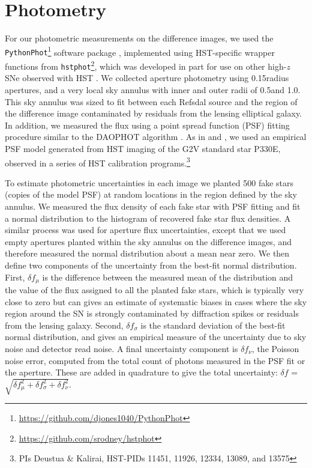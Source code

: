 \section{Photometry}\label{sec:Photometry}

For our photometric measurements on the difference images, we used the {\tt PythonPhot}\footnote{\url{https://github.com/djones1040/PythonPhot}} software package \citep{Jones:2015}, implemented using HST-specific wrapper functions from {\tt hstphot}\footnote{\url{https://github.com/srodney/hstphot}}, which was developed in part for use on other high-$z$ SNe observed with HST \citep[e.g.][]{Rodney:2015a,Rodney:2015b}.   We collected aperture photometry using 0.15\arcsec radius apertures, and a very local sky annulus with inner and outer radii of 0.5\arcsec and 1.0\arcsec.  This sky annulus was sized to fit between each Refsdal source and the region of the difference image contaminated by residuals from the lensing elliptical galaxy.  In addition, we measured the flux using a point spread function (PSF) fitting procedure similar to the DAOPHOT algorithm \citep{Stetson:1987}.  As in \citet{Rodney:2015a} and \citet{Rodney:2015b}, we used an empirical PSF model generated from HST imaging of the G2V standard star P330E, observed in a series of HST calibration programs.\footnote{PIs Deustua \& Kalirai, HST-PIDs 11451, 11926, 12334, 13089, and 13575}

To estimate photometric uncertainties in each image we planted 500 fake stars (copies of the model PSF) at random locations in the region defined by the sky annulus.  We measured the flux density of each fake star with PSF fitting and fit a normal distribution to the histogram of recovered fake star flux densities. A similar process was used for aperture flux uncertainties, except that we used empty apertures planted within the sky annulus on the difference images, and therefore measured the normal distribution about a mean near zero.   We then define two components of the uncertainty from the best-fit normal distribution. First, $\delta f_{\mu}$ is the difference between the measured mean of the distribution and the value of the flux assigned to all the planted fake stars, which is typically very close to zero but can gives an estimate of systematic biases in cases where the sky region around the SN is strongly contaminated by diffraction spikes or residuals from the lensing galaxy.  Second,  $\delta f_{\sigma}$ is the standard deviation of the best-fit normal distribution, and gives an empirical measure of the uncertainty due to sky noise and detector read noise. A final uncertainty component is $\delta f_{\nu}$, the Poisson noise error, computed from the total count of photons measured in the PSF fit or the aperture.  These are added in quadrature to give the total uncertainty: $\delta f$ = $\sqrt{ \delta f_{\mu}^2 + \delta f_{\sigma}^2 + \delta f_{\nu}^2}$.


